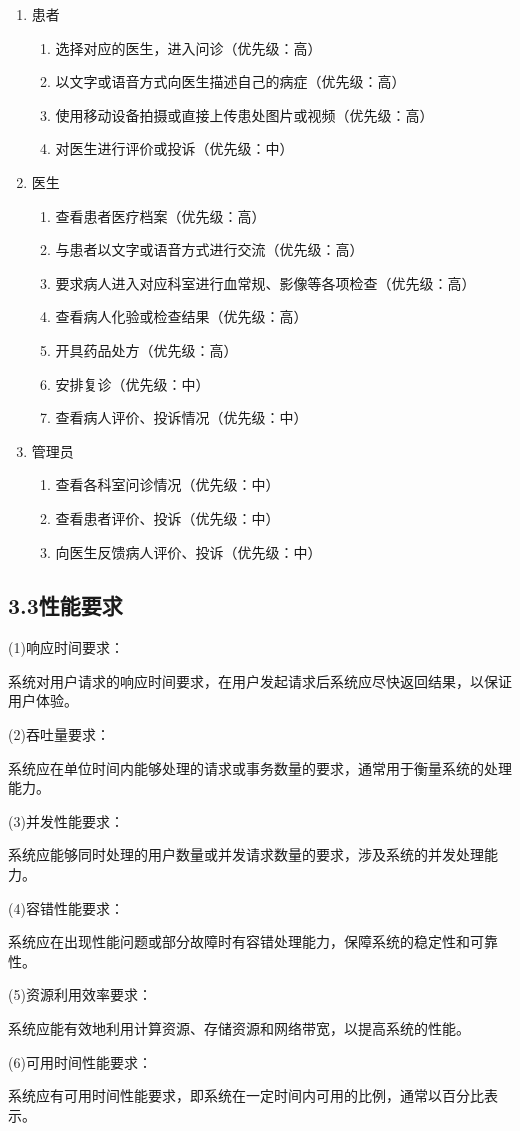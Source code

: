\documentclass[24pt,a4paper]{article}%
\begin{document}
\begin{enumerate}
	\item 患者
	\begin{enumerate}
		\item 选择对应的医生，进入问诊（优先级：高）
		\item 以文字或语音方式向医生描述自己的病症（优先级：高）
		\item 使用移动设备拍摄或直接上传患处图片或视频（优先级：高）
		\item 对医生进行评价或投诉（优先级：中）
	\end{enumerate}
	\item 医生
	\begin{enumerate}
		\item 查看患者医疗档案（优先级：高）
		\item 与患者以文字或语音方式进行交流（优先级：高）
		\item 要求病人进入对应科室进行血常规、影像等各项检查（优先级：高）
		\item 查看病人化验或检查结果（优先级：高）
		\item 开具药品处方（优先级：高）
		\item 安排复诊（优先级：中）
		\item 查看病人评价、投诉情况（优先级：中）
	\end{enumerate}
	\item 管理员
	\begin{enumerate}
		\item 查看各科室问诊情况（优先级：中）
		\item 查看患者评价、投诉（优先级：中）
		\item 向医生反馈病人评价、投诉（优先级：中）
	\end{enumerate}
\end{enumerate}


\subsection*{\songti 3.3性能要求}
\noindent (1)响应时间要求：\par 系统对用户请求的响应时间要求，在用户发起请求后系统应尽快返回结果，以保证用户体验。\par
\noindent (2)吞吐量要求：\par 系统应在单位时间内能够处理的请求或事务数量的要求，通常用于衡量系统的处理能力。\par
\noindent (3)并发性能要求：\par 系统应能够同时处理的用户数量或并发请求数量的要求，涉及系统的并发处理能力。\par
\noindent (4)容错性能要求：\par 系统应在出现性能问题或部分故障时有容错处理能力，保障系统的稳定性和可靠性。\par
\noindent (5)资源利用效率要求：\par 系统应能有效地利用计算资源、存储资源和网络带宽，以提高系统的性能。\par
\noindent (6)可用时间性能要求：\par 系统应有可用时间性能要求，即系统在一定时间内可用的比例，通常以百分比表示。\par
\end{document}
